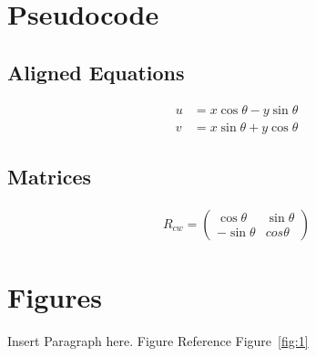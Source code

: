 \documentclass[english]{article}
\begin{document}

\nocite{*}
\maketitle

\setcounter{page}{1}

\clearpage
\pagebreak
\section{Pseudocode}

\subsection{Aligned Equations}

\begin{align*}
  u & = x \cos\theta - y \sin\theta \\
  v & = x \sin\theta + y \cos\theta
\end{align*}

\subsection{Matrices}

\begin{align*}
  R_{cw} = \begin{pmatrix}
             \cos \theta  & \sin \theta \\
             -\sin \theta & cos \theta
           \end{pmatrix}
\end{align*}


\clearpage
\pagebreak
\section{Figures}

\par Insert Paragraph here. Figure Reference Figure~\ref{fig:1}
\end{document}
